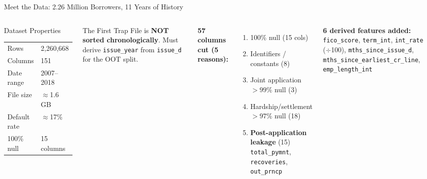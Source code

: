 \documentclass[aspectratio=169,11pt]{beamer}
\newcommand{\B}[1]{\textbf{#1}}
\begin{document}
\begin{frame}[shrink=3]{Meet the Data: 2.26 Million Borrowers, 11 Years of History}
  \begin{columns}[T]
      \begin{block}{Dataset Properties}
        \small\begin{tabular}{ll}
          \toprule
          Rows        & 2,260,668 \\
          Columns     & 151 \\
          Date range  & 2007--2018 \\
          File size   & $\approx$1.6 GB \\
          Default rate& $\approx$17\% \\
          100\% null  & 15 columns \\
          \bottomrule
        \end{tabular}
      \end{block}
      \vspace{4pt}
      \begin{alertblock}{The First Trap}\small
        File is \B{NOT sorted chronologically}. Must derive \texttt{issue\_year} from \texttt{issue\_d} for the OOT split.
      \end{alertblock}

      \small\textbf{57 columns cut (5 reasons):}
      \begin{enumerate}\small
        \item 100\% null (15 cols)
        \item Identifiers / constants (8)
        \item Joint application $>99\%$ null (3)
        \item Hardship/settlement $>97\%$ null (18)
        \item \B{Post-application leakage} (15)\\
        {\footnotesize\texttt{total\_pymnt}, \texttt{recoveries}, \texttt{out\_prncp}}
      \end{enumerate}
      \vspace{4pt}
      \small\textbf{6 derived features added:}\\
      {\footnotesize\texttt{fico\_score}, \texttt{term\_int}, \texttt{int\_rate} ($\div$100), \texttt{mths\_since\_issue\_d}, \texttt{mths\_since\_earliest\_cr\_line}, \texttt{emp\_length\_int}}
  \end{columns}
\end{frame}
\end{document}

